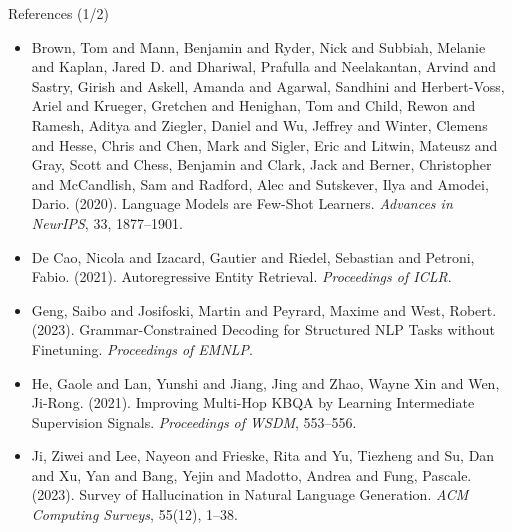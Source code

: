 \documentclass{beamer}
\begin{document}
\begin{frame}{References (1/2)}
    \footnotesize
    \begin{itemize}
        \item Brown, Tom and Mann, Benjamin and Ryder, Nick and Subbiah, Melanie and Kaplan, Jared D. and Dhariwal, Prafulla and Neelakantan, Arvind and Sastry, Girish and Askell, Amanda and Agarwal, Sandhini and Herbert-Voss, Ariel and Krueger, Gretchen and Henighan, Tom and Child, Rewon and Ramesh, Aditya and Ziegler, Daniel and Wu, Jeffrey and Winter, Clemens and Hesse, Chris and Chen, Mark and Sigler, Eric and Litwin, Mateusz and Gray, Scott and Chess, Benjamin and Clark, Jack and Berner, Christopher and McCandlish, Sam and Radford, Alec and Sutskever, Ilya and Amodei, Dario. (2020). Language Models are Few-Shot Learners. \emph{Advances in NeurIPS}, 33, 1877--1901.
        \vspace{0.3cm}
        \item De Cao, Nicola and Izacard, Gautier and Riedel, Sebastian and Petroni, Fabio. (2021). Autoregressive Entity Retrieval. \emph{Proceedings of ICLR}.
        \vspace{0.3cm}
        \item Geng, Saibo and Josifoski, Martin and Peyrard, Maxime and West, Robert. (2023). Grammar-Constrained Decoding for Structured NLP Tasks without Finetuning. \emph{Proceedings of EMNLP}.
        \vspace{0.3cm}
        \item He, Gaole and Lan, Yunshi and Jiang, Jing and Zhao, Wayne Xin and Wen, Ji-Rong. (2021). Improving Multi-Hop KBQA by Learning Intermediate Supervision Signals. \emph{Proceedings of WSDM}, 553--556.
        \vspace{0.3cm}
        \item Ji, Ziwei and Lee, Nayeon and Frieske, Rita and Yu, Tiezheng and Su, Dan and Xu, Yan and Bang, Yejin and Madotto, Andrea and Fung, Pascale. (2023). Survey of Hallucination in Natural Language Generation. \emph{ACM Computing Surveys}, 55(12), 1--38.
    \end{itemize}
\end{frame}
\end{document}
